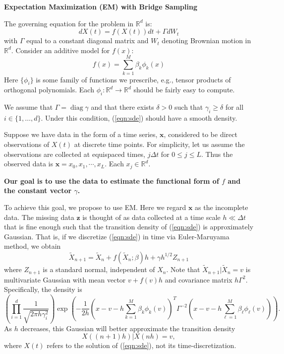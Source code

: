 \documentclass[12pt]{article}
\newcommand{\opdiag}{\ensuremath{\operatorname{diag}}}
\begin{document}
\begin{center}
\textbf{Expectation Maximization (EM) with Bridge Sampling}
\end{center}
The governing equation for the problem in $\mathbb{R}^d$ is:
\begin{equation} \label{eqn:sde}
dX(t) = f(X(t)) dt + \Gamma dW_t
\end{equation}
with $\Gamma$ equal to a constant diagonal matrix and $W_t$ denoting Brownian motion in $\mathbb{R}^d$.  Consider an additive model for $f(x)$:
\begin{equation} \label{eqn:parameteric}
f(x) = \sum_{k=1}^{M} \beta_k \phi_k (x)
\end{equation} 
Here $\{\phi_i\}$ is some family of functions we prescribe, e.g., tensor products of orthogonal polynomials.  Each $\phi_i : \mathbb{R}^d \to \mathbb{R}^d$ should be fairly easy to compute.

We assume that $\Gamma = \opdiag \gamma$ and that there exists $\delta > 0$ such that $\gamma_i \geq \delta$ for all $i \in \{1, \ldots, d\}$.  Under this condition, (\ref{eqn:sde}) should have a smooth density.

Suppose we have data in the form of a time series, $\mathbf{x}$, considered to be direct observations of $X(t)$ at discrete time points.  For simplicity, let us assume the observations are collected at equispaced times, $j \Delta t$ for $0 \leq j \leq L$. Thus the observed data is $\mathbf{x} = x_0, x_1, \cdots, x_L$.  Each $x_j \in \mathbb{R}^d$.

\textbf{Our goal is to use the data to estimate the functional form of $f$ and the constant vector $\gamma$.}

To achieve this goal, we propose to use EM.  Here we regard $\mathbf{x}$ as the incomplete data.  The missing data $\mathbf{z}$ is thought of as data collected at a time scale $h \ll \Delta t$ that is fine enough such that the transition density of (\ref{eqn:sde}) is approximately Gaussian.  That is, if we discretize (\ref{eqn:sde}) in time via Euler-Maruyama method, we obtain
\begin{equation} \label{eqn:euler}
\widetilde{X}_{n+1} = \widetilde{X}_n + f(\widetilde{X}_n; \beta) h + \gamma h^{1/2} Z_{n+1}
\end{equation}
where $Z_{n+1}$ is a standard normal, independent of $X_n$.  Note that $\widetilde{X}_{n+1} | \widetilde{X}_n = v$ is multivariate Gaussian with mean vector $v + f(v) h$ and covariance matrix $h \Gamma^2$.  Specifically, the density is
$$
\left( \prod_{i=1}^d \frac{1}{\sqrt{2 \pi h \gamma_i^2}} \right)
\exp \left( -\frac{1}{2h} (x - v - h \sum_{k=1}^M \beta_k \phi_k(v))^T \Gamma^{-2} (x - v - h \sum_{\ell=1}^M \beta_\ell \phi_\ell(v)) \right).
$$
As $h$ decreases, this Gaussian will better approximate the transition density
$$
X((n+1)h) | X(nh) = v,
$$
where $X(t)$ refers to the solution of (\ref{eqn:sde}), not its time-discretization.
\end{document}
